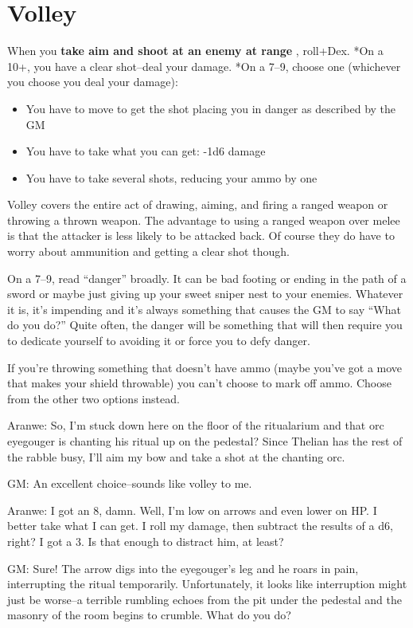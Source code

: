 \section{Volley}


 When you \textbf{take aim and shoot at an enemy at range}
, roll+Dex. *On a 10+, you have a clear shot--deal your damage. *On a 7--9, choose one (whichever you choose you deal your damage):
\begin{itemize}
\item You have to move to get the shot placing you in danger as described by the GM
\item You have to take what you can get: -1d6 damage
\item You have to take several shots, reducing your ammo by one

\end{itemize}


 Volley covers the entire act of drawing, aiming, and firing a ranged weapon or throwing a thrown weapon. The advantage to using a ranged weapon over melee is that the attacker is less likely to be attacked back. Of course they do have to worry about ammunition and getting a clear shot though.


 On a 7--9, read ``danger'' broadly. It can be bad footing or ending in the path of a sword or maybe just giving up your sweet sniper nest to your enemies. Whatever it is, it's impending and it's always something that causes the GM to say ``What do you do?'' Quite often, the danger will be something that will then require you to dedicate yourself to avoiding it or force you to defy danger.


 If you're throwing something that doesn't have ammo (maybe you've got a move that makes your shield throwable) you can't choose to mark off ammo. Choose from the other two options instead.


 Aranwe: So, I'm stuck down here on the floor of the ritualarium and that orc eyegouger is chanting his ritual up on the pedestal? Since Thelian has the rest of the rabble busy, I'll aim my bow and take a shot at the chanting orc.


 GM: An excellent choice--sounds like volley to me.


 Aranwe: I got an 8, damn. Well, I'm low on arrows and even lower on HP. I better take what I can get. I roll my damage, then subtract the results of a d6, right? I got a 3. Is that enough to distract him, at least?


 GM: Sure! The arrow digs into the eyegouger's leg and he roars in pain, interrupting the ritual temporarily. Unfortunately, it looks like interruption might just be worse--a terrible rumbling echoes from the pit under the pedestal and the masonry of the room begins to crumble. What do you do?


